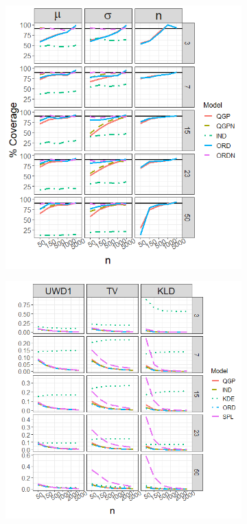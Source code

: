 \documentclass[preprint,12pt,authoryear]{elsarticle}
\begin{document}
\begin{figure}[hbt!]
\begin{subfigure}{.465\linewidth}
  \includegraphics[width=\linewidth]{Images/normal_coverage.png}
\end{subfigure}\hfill %
\begin{subfigure}{.524\linewidth}
  \includegraphics[width=\linewidth]{Images/normal_dists.png}

\end{subfigure}
\end{figure}
\end{document}

